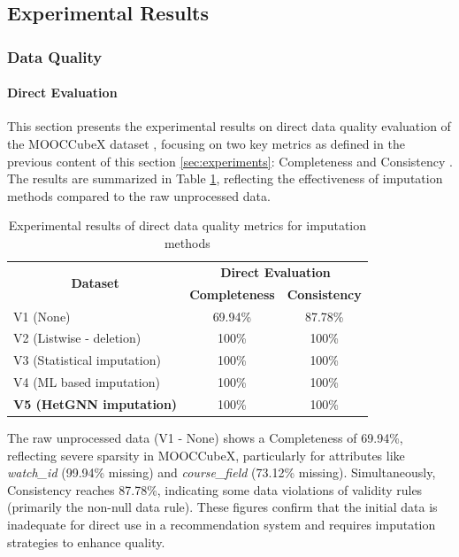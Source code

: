 \documentclass{ieeeaccess}
\begin{document}
\subsection{Experimental Results}

\subsubsection{Data Quality}

\paragraph{Direct Evaluation}
This section presents the experimental results on direct data quality evaluation of the MOOCCubeX dataset \cite{yu2021mooccubex}, focusing on two key metrics as defined in the previous content of this section \ref{sec:experiments}: Completeness and Consistency \cite{nguyen2025data_quality}. The results are summarized in Table \ref{tab:direct_dataquality_results}, reflecting the effectiveness of imputation methods compared to the raw unprocessed data.

\begin{table}[]
\centering
\caption{Experimental results of direct data quality metrics for imputation methods}
\label{tab:direct_dataquality_results}
\begin{tabular}{|l|cc|}
\hline
\multicolumn{1}{|c|}{\multirow{2}{*}{\textbf{Dataset}}} & \multicolumn{2}{c|}{\textbf{Direct Evaluation}} \\ \cline{2-3} 
\multicolumn{1}{|c|}{} & \multicolumn{1}{c|}{\textbf{Completeness}} & \textbf{Consistency} \\ \hline
V1 (None) & \multicolumn{1}{c|}{69.94\%} & 87.78\% \\ \hline
V2 (Listwise - deletion) & \multicolumn{1}{c|}{100\%} & 100\% \\ \hline
V3 (Statistical imputation) & \multicolumn{1}{c|}{100\%} & 100\% \\ \hline
V4 (ML based imputation) & \multicolumn{1}{c|}{100\%} & 100\% \\ \hline
\textbf{V5 (HetGNN imputation)} & \multicolumn{1}{c|}{100\%} & 100\% \\ \hline
\end{tabular}
\end{table}

The raw unprocessed data (V1 - None) shows a Completeness of 69.94\%, reflecting severe sparsity in MOOCCubeX, particularly for attributes like \textit{watch\_id} (99.94\% missing) and \textit{course\_field} (73.12\% missing). Simultaneously, Consistency reaches 87.78\%, indicating some data violations of validity rules (primarily the non-null data rule). These figures confirm that the initial data is inadequate for direct use in a recommendation system and requires imputation strategies to enhance quality.
\end{document}
